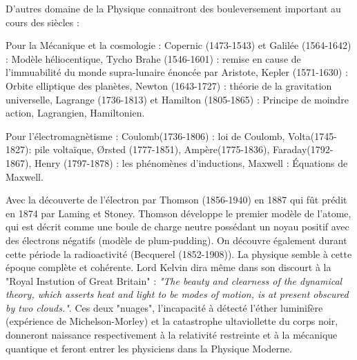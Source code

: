 D'autres domaine de la Physique connaitront des bouleversement important au cours des siècles : 

Pour la Mécanique et la cosmologie : Copernic (1473-1543) et Galilée (1564-1642) : Modèle héliocentique, Tycho Brahe (1546-1601) : remise en cause de  l'immuabilité du monde supra-lunaire énoncée par Aristote, Kepler (1571-1630) : Orbite elliptique des planètes, Newton (1643-1727) : théorie de la gravitation universelle, Lagrange (1736-1813) et Hamilton (1805-1865) : Principe de moindre action, Lagrangien, Hamiltonien.

Pour l'électromagnètisme : Coulomb(1736-1806) : loi de Coulomb, Volta(1745-1827): pile voltaïque, Ørsted (1777-1851), Ampère(1775-1836), Faraday(1792-1867), Henry (1797-1878) : les phénomènes d'inductions, Maxwell : Équations de Maxwell.

Avec la découverte de l'électron par Thomson (1856-1940) en 1887 qui fût prédit en 1874 par Laming et Stoney. Thomson développe le premier modèle de l'atome, qui est décrit comme une boule de charge neutre possédant un noyau positif avec des électrons négatifs (modèle de plum-pudding). On découvre également durant cette période la radioactivité (Becquerel (1852-1908)). La physique semble à cette époque complète et cohérente. Lord Kelvin dira même dans son discourt à la "Royal Instution of Great Britain" : \textit{"The beauty and clearness of the dynamical theory, which asserts heat and light to be modes of motion, is at present obscured by two clouds."}. Ces deux "nuages", l'incapacité à détecté l'éther luminifère  (expérience de Michelson-Morley) et la catastrophe ultaviollette du corps noir, donneront naissance respectivement à la relativité restreinte et à la mécanique quantique et feront entrer les physiciens dans la Physique Moderne.


